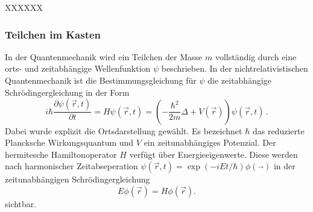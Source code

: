 XXXXXX

\subsubsection{Teilchen im Kasten}
\label{subsubsec:kasten}
In der Quantenmechanik wird ein Teilchen der Masse $m$ vollständig durch eine orts- und zeitabhängige Wellenfunktion $\psi$ beschrieben. In der nichtrelativistischen Quantenmechanik ist die Bestimmungsgleichung für $\psi$ die zeitabhängige Schrödingergleichung in der Form
\begin{equation}
  i \hbar \frac{\partial \psi(\vec{r},t)}{\partial t} = H \psi(\vec{r},t) = \left(- \frac{\hbar^2}{2 m} \Delta + V(\vec{r})\right) \psi(\vec{r},t)\,.
  \label{eqn:schroedingerZeitabhaengig}
\end{equation}
Dabei wurde explizit die Ortsdarstellung gewählt. Es bezeichnet $\hbar$ das reduzierte Plancksche Wirkungsquantum und $V$ ein zeitunabhängiges Potenzial. Der hermitesche Hamiltonoperator $H$ verfügt über Energieeigenwerte. Diese werden nach harmonischer Zeitabseperation $\psi(\vec{r},t) = \exp(-i E t / \hbar) \phi(\vec{})$ in der zeitunabhängigen Schrödingergleichung
\begin{equation}
  E \phi(\vec{r}) = H \phi(\vec{r}).
  \label{eqn:schroedingerZeitunabhaengig}
\end{equation}
sichtbar.
